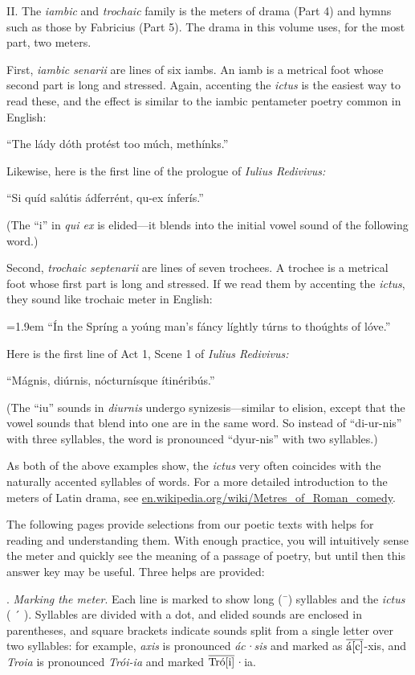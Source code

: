 \documentclass[20pt, twoside]{extarticle}
\begin{document}
\begin{singlespace}
\begin{en}
\noindent
II. The \emph{iambic} and \emph{trochaic} family is the meters of drama (Part 4) and hymns such as those by Fabricius (Part 5). The drama in this volume uses, for the most part, two meters.

\noindent
First, \emph{iambic senarii} are lines of six iambs. An iamb is a metrical foot whose second part is long and stressed. Again, accenting the \emph{ictus} is the easiest way to read these, and the effect is similar to the iambic pentameter poetry common in English:

“The lády dóth protést too múch, methínks.”

\noindent
Likewise, here is the first line of the prologue of \emph{Iulius Redivivus:}

“Si quíd salútis ádferrént, qu-ex ínferís.”

\noindent
(The “i” in \emph{qui ex} is elided—it blends into the initial vowel sound of the following word.)

\noindent
Second, \emph{trochaic septenarii} are lines of seven trochees. A trochee is a metrical foot whose first part is long and stressed. If we read them by accenting the \emph{ictus}, they sound like trochaic meter in English:

\hangindent=1.9em
“Ín the Spríng a yoúng man’s fáncy líghtly túrns to thoúghts of lóve.”

\noindent
Here is the first line of Act 1, Scene 1 of \emph{Iulius Redivivus:}

“Mágnis, diúrnis, nócturnísque ítinéribús.”

\noindent
(The “iu” sounds in \emph{diurnis} undergo synizesis—similar to elision, except that the vowel sounds that blend into one are in the same word. So instead of “di-ur-nis” with three syllables, the word is  pronounced “dyur-nis” with two syllables.)

\noindent
As both of the above examples show, the \emph{ictus} very often coincides with the naturally accented syllables of words. For a more detailed introduction to the meters of Latin drama, see \url{en.wikipedia.org/wiki/Metres_of_Roman_comedy}.

\noindent
The following pages provide selections from our poetic texts with helps for reading and understanding them. With enough practice, you will intuitively sense the meter and quickly see the meaning of a passage of poetry, but until then this answer key may be useful. Three helps are provided:

\newcommand{\ol}[1]{$\overline{\mbox{#1\vphantom{T}}}$}
. \emph{Marking the meter}. Each line is marked to show long (\hspace{0.1em}¯\hspace{-0.1em}) syllables and the \emph{ictus} ( ´ ). Syllables are divided with a dot, and elided sounds are enclosed in parentheses, and square brackets indicate sounds split from a single letter over two syllables: for example, \emph{axis} is pronounced \emph{ác·sis} and marked as \ol{á{[}c{]}}-xis, and \emph{Troia} is pronounced \emph{Trói-ia} and marked \ol{Tró{[}i{]}}·ia.


\end{en}
\end{singlespace}
\end{document}
